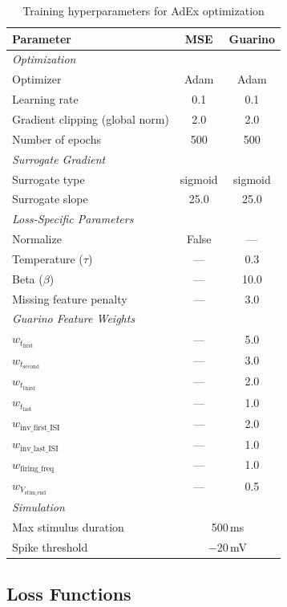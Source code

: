 \documentclass[conference]{IEEEtran}
\begin{document}
\begin{table}[t]
\centering
\caption{Training hyperparameters for AdEx optimization}
\label{tab:training-params}
\begin{tabular}{lcc}
\toprule
\textbf{Parameter} & \textbf{MSE} & \textbf{Guarino} \\
\midrule
\multicolumn{3}{l}{\textit{Optimization}} \\
Optimizer & Adam & Adam \\
Learning rate & 0.1 & 0.1 \\
Gradient clipping (global norm) & 2.0 & 2.0 \\
Number of epochs & 500 & 500 \\
\midrule
\multicolumn{3}{l}{\textit{Surrogate Gradient}} \\
Surrogate type & sigmoid & sigmoid \\
Surrogate slope & 25.0 & 25.0 \\
\midrule
\multicolumn{3}{l}{\textit{Loss-Specific Parameters}} \\
Normalize & False & --- \\
Temperature ($\tau$) & --- & 0.3 \\
Beta ($\beta$) & --- & 10.0 \\
Missing feature penalty & --- & 3.0 \\
\midrule
\multicolumn{3}{l}{\textit{Guarino Feature Weights}} \\
$w_{t_\text{first}}$ & --- & 5.0 \\
$w_{t_\text{second}}$ & --- & 3.0 \\
$w_{t_\text{third}}$ & --- & 2.0 \\
$w_{t_\text{last}}$ & --- & 1.0 \\
$w_{\text{inv\_first\_ISI}}$ & --- & 2.0 \\
$w_{\text{inv\_last\_ISI}}$ & --- & 1.0 \\
$w_{\text{firing\_freq}}$ & --- & 1.0 \\
$w_{V_\text{stim\_end}}$ & --- & 0.5 \\
\midrule
\multicolumn{3}{l}{\textit{Simulation}} \\
Max stimulus duration & \multicolumn{2}{c}{500\,ms} \\
Spike threshold & \multicolumn{2}{c}{$-20$\,mV} \\
\bottomrule
\end{tabular}
\end{table}

\subsection{Loss Functions}\label{sec:loss}
\end{document}
